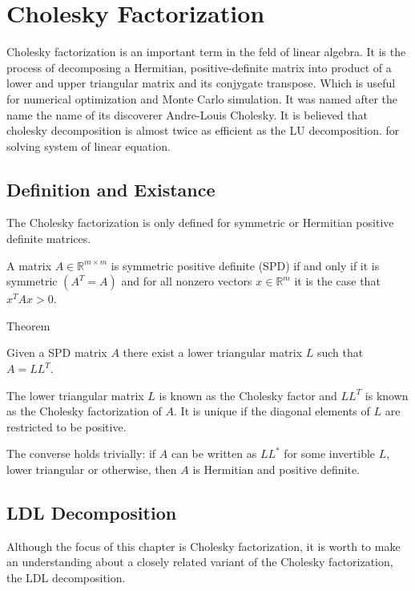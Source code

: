 
\chapter{Cholesky Factorization} %

\label{ChapterX} %

Cholesky factorization is an important term in the feld of linear algebra. It is the process of decomposing a Hermitian, positive-definite matrix into product of a lower and upper triangular matrix and its conjygate transpose. Which is useful for numerical optimization and Monte Carlo simulation. It was named after the name the name of its discoverer Andre-Louis Cholesky. It is believed that cholesky decomposition is almost twice as efficient as the LU decomposition. for solving system of linear equation.

\section{Definition and Existance}
The Cholesky factorization is only defined for symmetric or Hermitian positive definite matrices.
\begin{definition}
A matrix $A\in \mathbb{R}^{m\times m}$ is symmetric positive definite (SPD) if and only if it is symmetric $(A^T=A)$ and for all nonzero vectors $x\in \mathbb{R}^m$ it is the case that $x^TAx>0$.	
\end{definition}

\begin{mybox}{Theorem}
\begin{theorem}
	Given a SPD matrix $A$ there exist a lower triangular matrix $L$ such that $A=LL^T$.
\end{theorem}
\end{mybox}
The lower triangular matrix $L$ is known as the Cholesky factor and $LL^T$ is known as the Cholesky factorization of $A$. It is unique if the diagonal elements of $L$ are restricted to be positive.

The converse holds trivially: if $A$ can be written as $LL^*$ for some invertible $L$, lower triangular or otherwise, then $A$ is Hermitian and positive definite.
\section{LDL Decomposition}
Although the focus of this chapter is Cholesky factorization, it is worth to make an understanding about a closely related variant of the Cholesky factorization, the LDL decomposition.

